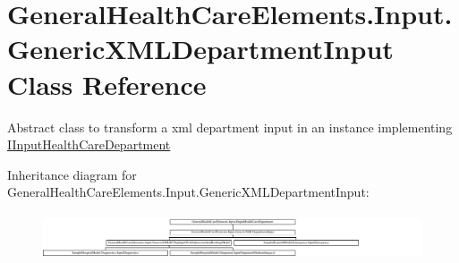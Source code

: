 \hypertarget{class_general_health_care_elements_1_1_input_1_1_generic_x_m_l_department_input}{}\section{General\+Health\+Care\+Elements.\+Input.\+Generic\+X\+M\+L\+Department\+Input Class Reference}
\label{class_general_health_care_elements_1_1_input_1_1_generic_x_m_l_department_input}


Abstract class to transform a xml department input in an instance implementing \hyperlink{interface_general_health_care_elements_1_1_input_1_1_i_input_health_care_department}{I\+Input\+Health\+Care\+Department}  


Inheritance diagram for General\+Health\+Care\+Elements.\+Input.\+Generic\+X\+M\+L\+Department\+Input\+:\begin{figure}[H]
\begin{center}
\leavevmode
\includegraphics[height=1.387856cm]{class_general_health_care_elements_1_1_input_1_1_generic_x_m_l_department_input}
\end{center}
\end{figure}
